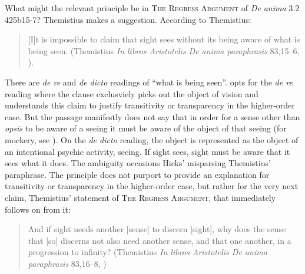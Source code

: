 What might the relevant principle be in \textsc{The Regress Argument} of \emph{De anima} 3.2 425b15-7? Themistius makes a suggestion. According to Themistius: 
\begin{quote}
	[I]t is impossible to claim that sight sees without its being aware of what is being seen. (Themistius \emph{In libros Aristotelis De anima paraphrasis} 83,15–6, \citealt[105]{Todd:1996aa}).
\end{quote}
There are \emph{de re} and \emph{de dicto} readings of ``what is being seen''. \citet[435]{Hicks:1907uq} opts for the \emph{de re} reading where the clause exclusviely picks out the object of vision and understands this claim to justify transitivity or transparency in the higher-order case. But the passage manifestly does not say that in order for a sense other than \emph{opsis} to be aware of a seeing it must be aware of the object of that seeing (for mockery, see \citealt[44–5]{Kosman:2014ab}). On the \emph{de dicto} reading, the object is represented as the object of an intentional psychic activity, seeing. If sight sees, sight must be aware that it sees what it does. The ambiguity occasions Hicks' misparsing Themistius' paraphrase. The principle does not purport to provide an explanation for transitivity or transparency in the higher-order case, but rather for the very next claim, Themistius' statement of \textsc{The Regress Argument}, that immediately follows on from it:
\begin{quote}
	And if sight needs another [sense] to discern [sight], why does the sense that [so] discerns not also need another sense, and that one another, in a progression to infinity? (Themistius \emph{In libros Aristotelis De anima paraphrasis} 83,16–8, \citealt[105]{Todd:1996aa})
\end{quote}

